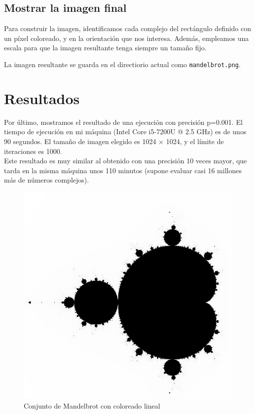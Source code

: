 \documentclass[11pt]{article}
\begin{document}
\subsection*{Mostrar la imagen final}

Para construir la imagen, identificamos cada complejo del rectángulo definido con un píxel coloreado, y en la orientación que nos interesa. Además, empleamos una escala para que la imagen resultante tenga siempre un tamaño fijo.
\vspace{0.5em}



\vspace{0.5em}
La imagen resultante se guarda en el directiorio actual como \verb|mandelbrot.png|.

\section*{Resultados}
Por último, mostramos el resultado de una ejecución con precisión p=0.001. El tiempo de ejecución en mi máquina (Intel Core i5-7200U @ 2.5 GHz) es de unos 90 segundos. El tamaño de imagen elegido es 1024 $\times$ 1024, y el límite de iteraciones es 1000.\\

Este resultado es muy similar al obtenido con una precisión 10 veces mayor, que tarda en la misma máquina unos 110 minutos (supone evaluar casi 16 millones más de números complejos).

\begin{figure}[!ht]
    \centering
    \includegraphics[width=.65\textwidth]{img/0001-cropped}
	\caption{Conjunto de Mandelbrot con coloreado lineal}
\end{figure}
\end{document}
